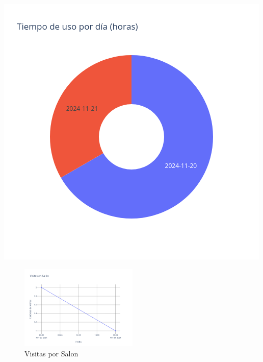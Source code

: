 \documentclass{article}
\begin{document}
    \begin{minipage}{0.48\textwidth}
        \centering
        \includegraphics[width=\textwidth]{../img/pie/UD102-30Dias-03-12-2024.png}
    \end{minipage}
    


    \begin{figure}[h!]
        \centering
        \includegraphics[width=0.5\textwidth]{../img/poli/VS102-30Dias-03-12-2024.png}
        \caption{Visitas por Salon}
    \end{figure}

    


    
\end{document}
